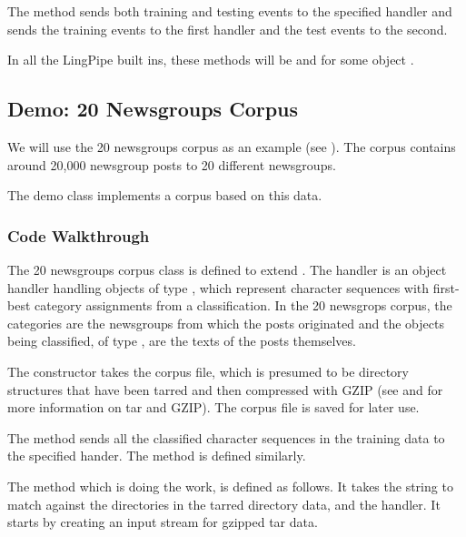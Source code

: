 The method  sends both training and testing
events to the specified handler and  sends the
training events to the first handler and the test events to the
second.

In all the LingPipe built ins, these methods will be
 and
 for some object .

\subsection{Demo: 20 Newsgroups Corpus}

We will use the 20 newsgroups corpus as an example (see
).  The corpus contains around 20,000
newsgroup posts to 20 different newsgroups.

The demo class  implements a corpus based
on this data.  

\subsubsection{Code Walkthrough}

The 20 newsgroups corpus class is defined to extend .
%
%
The handler is an object handler handling objects of type
, which represent character sequences
with first-best category assignments from a classification.
In the 20 newsgrops corpus, the categories are the newsgroups from
which the posts originated and the objects being classified,
of type , are the texts of the posts themselves.

The constructor takes the corpus file, which is presumed to be
directory structures that have been tarred and then compressed with
GZIP (see  and  for more information on
tar and GZIP).  The corpus file is saved for later use.  

The  method sends all the classified character
sequences in the training data to the specified hander.
%
%
The  method is defined similarly.  

The  method which is doing the work, is
defined as follows.
%
%
It takes the string to match against the directories in the tarred
directory data, and the handler.  It starts by creating an input
stream for gzipped tar data.  

